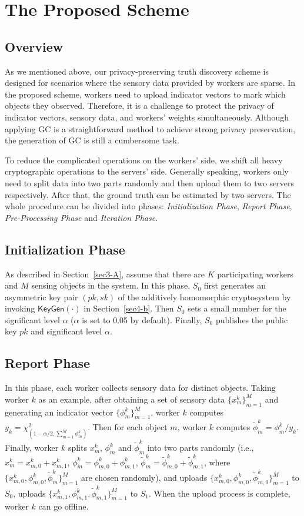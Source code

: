 \documentclass[conference]{IEEEtran}
\begin{document}
\section{The Proposed Scheme}\label{sec5}
\subsection{Overview}
As we mentioned above, our privacy-preserving truth discovery scheme is designed for scenarios where the sensory data provided by workers are sparse.
In the proposed scheme, workers need to upload indicator vectors to mark which objects they observed.
Therefore, it is a challenge to protect the privacy of indicator vectors, sensory data, and workers' weights simultaneously.
Although applying GC is a straightforward method to achieve strong privacy preservation, the generation of GC is still a cumbersome task.

To reduce the complicated operations on the workers' side, we shift all heavy cryptographic operations to the servers' side.
Generally speaking, workers only need to split data into two parts randomly and then upload them to two servers respectively.
After that, the ground truth can be estimated by two servers.
The whole procedure can be divided into  phases: {\em Initialization Phase}, {\em Report Phase}, {\em Pre-Processing Phase} and {\em Iteration Phase}.

\subsection{Initialization Phase}
As described in Section~\ref{sec3-A}, assume that there are $K$ participating workers and $M$ sensing objects in the system.
In this phase, $S_0$ first generates an asymmetric key pair $(pk, sk)$ of the additively homomorphic cryptosystem by invoking $\mathsf{KeyGen}(\cdot)$ in Section~\ref{sec4-b}.
Then $S_0$ sets a small number for the significant level $\alpha$ ($\alpha$ is set to 0.05 by default).
Finally, $S_0$ publishes the public key $pk$ and significant level $\alpha$.

\subsection{Report Phase}
In this phase, each worker collects sensory data for distinct objects.
Taking worker $k$ as an example, after obtaining a set of sensory data $\{x_m^k\}_{m=1}^M$ and generating an indicator vector $\{\phi_m^k\}_{m=1}^M$, worker $k$ computes $y_k = \chi^2_{(1-\alpha/2, \sum_{m=1}^M \phi_m^k)}$.
Then for each object $m$, worker $k$ computes $\tilde{\phi}_m^k = \phi_m^k / y_k$.
Finally, worker $k$ splits $x_m^k$, $\phi_m^k$ and $\tilde{\phi}_m^k$ into two parts randomly (i.e., $x_m^k = x_{m,0}^k + x_{m,1}^k$, $\phi_m^k = \phi_{m,0}^k + \phi_{m,1}^k$, $\tilde{\phi}_m^k = \tilde{\phi}_{m,0}^k + \tilde{\phi}_{m,1}^k$, where $\{x_{m,0}^k, \phi_{m,0}^k, \tilde{\phi}_m^k\}_{m=1}^M$ are chosen randomly), and uploads $\{x_{m,0}^k, \phi_{m,0}^k ,\tilde{\phi}_{m,0}^k\}_{m=1}^M$ to $S_0$, uploads $\{x_{m,1}^k, \phi_{m,1}^k, \tilde{\phi}_{m,1}^k\}_{m=1}^M$ to $S_1$.
When the upload process is complete, worker $k$ can go offline.
\end{document}
